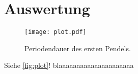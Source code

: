 \section{Auswertung}
\label{sec:Auswertung}

\begin{figure}
  \centering
  \texttt{[image: plot.pdf]}
  \caption{Periodendauer des ersten Pendels.}
  \label{fig:plot}
\end{figure}


Siehe \autoref{fig:plot}! blaaaaaaaaaaaaaaaaaaaaa
